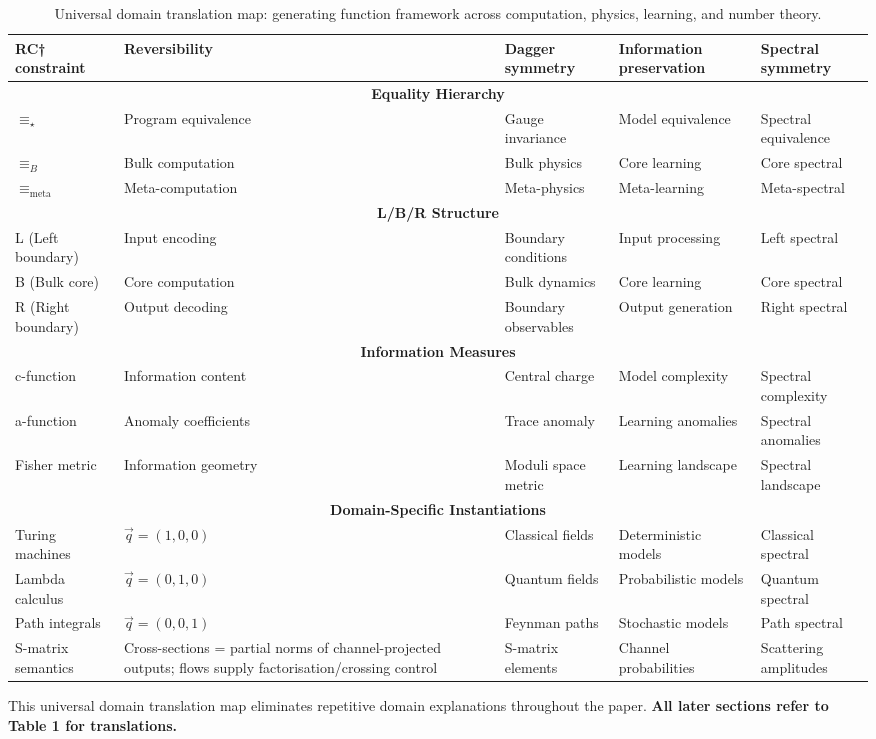 \begin{table}[h]
\begin{tabular}{|l|p{2cm}|p{2cm}|p{2cm}|p{2cm}|}
\hline
RC† constraint & Reversibility & Dagger symmetry & Information preservation & Spectral symmetry \\
\hline
\multicolumn{5}{|c|}{\textbf{Equality Hierarchy}} \\
\hline
$\equiv_\star$ & Program equivalence & Gauge invariance & Model equivalence & Spectral equivalence \\
\hline
$\equiv_B$ & Bulk computation & Bulk physics & Core learning & Core spectral \\
\hline
$\equiv_{\text{meta}}$ & Meta-computation & Meta-physics & Meta-learning & Meta-spectral \\
\hline
\multicolumn{5}{|c|}{\textbf{L/B/R Structure}} \\
\hline
L (Left boundary) & Input encoding & Boundary conditions & Input processing & Left spectral \\
\hline
B (Bulk core) & Core computation & Bulk dynamics & Core learning & Core spectral \\
\hline
R (Right boundary) & Output decoding & Boundary observables & Output generation & Right spectral \\
\hline
\multicolumn{5}{|c|}{\textbf{Information Measures}} \\
\hline
c-function & Information content & Central charge \cite{zamolodchikov1986} & Model complexity & Spectral complexity \\
\hline
a-function & Anomaly coefficients & Trace anomaly \cite{cardy1988,komargodski2011} & Learning anomalies & Spectral anomalies \\
\hline
Fisher metric & Information geometry & Moduli space metric & Learning landscape & Spectral landscape \\
\hline
\multicolumn{5}{|c|}{\textbf{Domain-Specific Instantiations}} \\
\hline
Turing machines & $\vec{q} = (1,0,0)$ & Classical fields & Deterministic models & Classical spectral \\
\hline
Lambda calculus & $\vec{q} = (0,1,0)$ & Quantum fields & Probabilistic models & Quantum spectral \\
\hline
Path integrals & $\vec{q} = (0,0,1)$ & Feynman paths & Stochastic models & Path spectral \\
\hline
S-matrix semantics & Cross-sections = partial norms of channel-projected outputs; flows supply factorisation/crossing control & S-matrix elements & Channel probabilities & Scattering amplitudes \\
\hline
\end{tabular}
\caption{Universal domain translation map: generating function framework across computation, physics, learning, and number theory.}
\label{tab:universal-domain-translation}
\end{table}

This universal domain translation map eliminates repetitive domain explanations throughout the paper. \textbf{All later sections refer to Table 1 for translations.}



